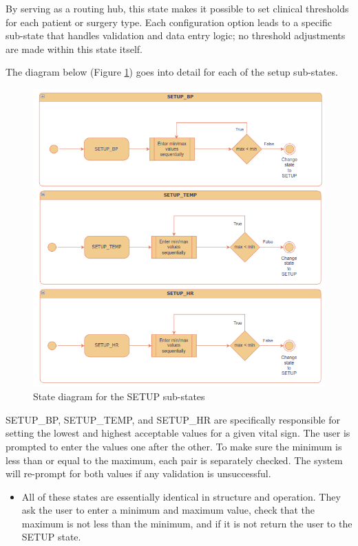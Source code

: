 By serving as a routing hub, this state makes it possible to set clinical thresholds for each patient or surgery type. Each configuration option leads to a specific sub-state that handles validation and data entry logic; no threshold adjustments are made within this state itself.

The diagram below (Figure \ref{fig:states_setup_substates}) goes into detail for each of the setup sub-states.

\begin{figure}[H]
	\centering
	\includegraphics[width=\textwidth]{diagrams/states_setup_substates}
	\caption{State diagram for the SETUP sub-states}
	\label{fig:states_setup_substates}
\end{figure}

SETUP\_BP, SETUP\_TEMP, and SETUP\_HR are specifically responsible for setting the lowest and highest acceptable values for a given vital sign. The user is prompted to enter the values one after the other. To make sure the minimum is less than or equal to the maximum, each pair is separately checked. The system will re-prompt for both values if any validation is unsuccessful.

\begin{itemize}
	\item All of these states are essentially identical in structure and operation. They ask the user to enter a minimum and maximum value, check that the maximum is not less than the minimum, and if it is not return the user to the SETUP state.
\end{itemize}

